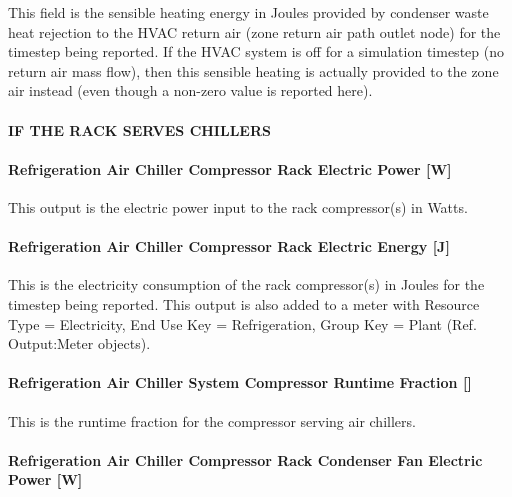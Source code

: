 This field is the sensible heating energy in Joules provided by condenser waste heat rejection to the HVAC return air (zone return air path outlet node) for the timestep being reported. If the HVAC system is off for a simulation timestep (no return air mass flow), then this sensible heating is actually provided to the zone air instead (even though a non-zero value is reported here).

\paragraph{IF THE RACK SERVES CHILLERS}\label{if-the-rack-serves-chillers}

\paragraph{Refrigeration Air Chiller Compressor Rack Electric Power {[}W{]}}\label{refrigeration-air-chiller-compressor-rack-electric-power-w}

This output is the electric power input to the rack compressor(s) in Watts.

\paragraph{Refrigeration Air Chiller Compressor Rack Electric Energy {[}J{]}}\label{refrigeration-air-chiller-compressor-rack-electric-energy-j}

This is the electricity consumption of the rack compressor(s) in Joules for the timestep being reported. This output is also added to a meter with Resource Type = Electricity, End Use Key = Refrigeration, Group Key = Plant (Ref. Output:Meter objects).

\paragraph{Refrigeration Air Chiller System Compressor Runtime Fraction {[]}}\label{refrigeration-air-chiller-system-compressor-runtime-fraction}

This is the runtime fraction for the compressor serving air chillers.

\paragraph{Refrigeration Air Chiller Compressor Rack Condenser Fan Electric Power {[}W{]}}\label{refrigeration-air-chiller-compressor-rack-condenser-fan-electric-power-w}

